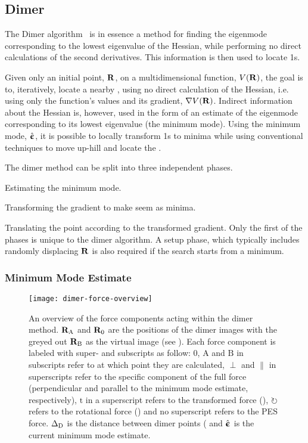 \subsection{Dimer}
\label{sec:dimer}

The Dimer algorithm~\cite{dimer-original-1999} is in essence a method for finding the eigenmode corresponding to the lowest eigenvalue of the Hessian, while performing no direct calculations of the second derivatives.
This information is then used to locate \sap1s.


Given only an initial point, ${\mathrm{\mathbf{\bm{R}}}}$, on a multidimensional function, $V({\mathrm{\mathbf{\bm{R}}}})$, the goal is to, iteratively, locate a nearby , using no direct calculation of the Hessian, i.e. using only the function's values and its gradient, $\nabla V({\mathrm{\mathbf{\bm{R}}}})$.
Indirect information about the Hessian is, however, used in the form of an estimate of the eigenmode corresponding to its lowest eigenvalue (the minimum mode).
Using the minimum mode, $\hat{{\mathrm{\mathbf{\bm{\upepsilon}}}}}$, it is possible to locally transform \sap1s to minima while using conventional techniques to move up-hill and locate the .

The dimer method can be split into three independent phases.
\item Estimating the minimum mode.
\item Transforming the gradient to make  seem as minima.
\item Translating the point according to the transformed gradient.
\een
Only the first of the phases is unique to the dimer algorithm.
A setup phase, which typically includes randomly displacing ${\mathrm{\mathbf{\bm{R}}}}$ is also required if the search starts from a minimum.
\recent

\subsubsection{Minimum Mode Estimate}
\begin{figure}[t]
  \begin{center}
    \texttt{[image: dimer-force-overview]}
\parbox{0.85\linewidth}{    \caption{An overview of the force components acting within the dimer method.
${\mathrm{\mathbf{\bm{R}}}}_\text{A}$ and ${\mathrm{\mathbf{\bm{R}}}}_0$ are the positions of the dimer images with the greyed out ${\mathrm{\mathbf{\bm{R}}}}_\text{B}$ as the virtual image (see ).
Each force component is labeled with super- and subscripts as follow:
$0$, $\text{A}$ and $\text{B}$ in subscripts refer to at which point they are calculated,
$\perp$ and $\parallel$ in superscripts refer to the specific component of the full force (perpendicular and parallel to the minimum mode estimate, respectively),
$\text{t}$ in a superscript refers to the transformed force (),
$\circlearrowright$ refers to the rotational force () and no superscript refers to the PES force.
$\Delta_\text{D}$ is the distance between dimer points ( and $\hat{{\mathrm{\mathbf{\bm{\upepsilon}}}}}$ is the current minimum mode estimate.
}}
    \label{fig:dimer-force-overview}
  \end{center}
\end{figure}

